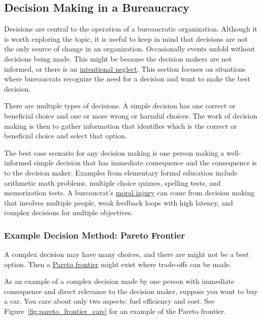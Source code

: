 \subsection*{Decision Making in a Bureaucracy\label{sec:decision-making}}

Decisions are central to the operation of a bureaucratic organization. Although it is worth exploring the topic, it is useful to keep in mind that decisions are not the only source of change in an organization. Occasionally events unfold without decisions being made. This might be because the decision makers are not informed, or there is an \href{https://en.wikipedia.org/wiki/Willful_blindness}{intentional neglect}. This section focuses on situations where bureaucrats recognize the need for a decision and want to make the best decision.

There are multiple types of decisions. 
A \gls{simple decision} has one correct or beneficial choice and one or more wrong or harmful choices. The work of decision making is then to gather information that identifies which is the correct or beneficial choice and select that option.

The best case scenario for any decision making is one person making a well-informed simple decision that has immediate consequence and the consequence is to the decision maker. Examples from elementary formal education include arithmetic math problems, multiple choice quizzes, spelling tests, and memorization tests. A bureaucrat's \href{https://en.wikipedia.org/wiki/Moral_injury}{moral injury} can come from decision making that involves multiple people, weak feedback loops with high latency, and complex decisions for multiple objectives.

\subsubsection{Example Decision Method: Pareto Frontier\label{sec:pareto}}

A complex decision may have many choices, and there are might not be a best option. Then a \href{https://en.wikipedia.org/wiki/Pareto_front}{Pareto frontier} might exist where trade-offs can be made. 

As an example of a complex decision made by one person with immediate consequence and direct relevance to the decision maker, suppose you want to buy a car. You care about only two aspects: fuel efficiency and cost. See Figure~\ref{fig:pareto_frontier_cars} for an example of the Pareto frontier.

